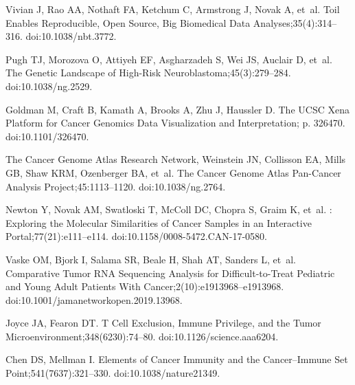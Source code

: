 \documentclass[10pt,letterpaper]{article}
\begin{document}
%
%


\begin{thebibliography}{10}
	
	Vivian J, Rao AA, Nothaft FA, Ketchum C, Armstrong J, Novak A, et~al.
	\newblock Toil Enables Reproducible, Open Source, Big Biomedical Data
	Analyses;35(4):314--316.
	\newblock doi:{10.1038/nbt.3772}.
	
	Pugh TJ, Morozova O, Attiyeh EF, Asgharzadeh S, Wei JS, Auclair D, et~al.
	\newblock The Genetic Landscape of High-Risk Neuroblastoma;45(3):279--284.
	\newblock doi:{10.1038/ng.2529}.
	
	Goldman M, Craft B, Kamath A, Brooks A, Zhu J, Haussler D.
	\newblock The {{UCSC Xena Platform}} for Cancer Genomics Data Visualization and
	Interpretation; p. 326470.
	\newblock doi:{10.1101/326470}.
	
	{The Cancer Genome Atlas Research Network}, Weinstein JN, Collisson EA, Mills
	GB, Shaw KRM, Ozenberger BA, et~al.
	\newblock The {{Cancer Genome Atlas Pan}}-{{Cancer}} Analysis
	Project;45:1113--1120.
	\newblock doi:{10.1038/ng.2764}.
	
	Newton Y, Novak AM, Swatloski T, McColl DC, Chopra S, Graim K, et~al.
	: {{Exploring}} the {{Molecular Similarities}} of
	{{Cancer Samples}} in an {{Interactive Portal}};77(21):e111--e114.
	\newblock doi:{10.1158/0008-5472.CAN-17-0580}.
	
	Vaske OM, Bjork I, Salama SR, Beale H, Shah AT, Sanders L, et~al.
	\newblock Comparative {{Tumor RNA Sequencing Analysis}} for
	{{Difficult}}-to-{{Treat Pediatric}} and {{Young Adult Patients With
			Cancer}};2(10):e1913968--e1913968.
	\newblock doi:{10.1001/jamanetworkopen.2019.13968}.
	
	Joyce JA, Fearon DT.
	\newblock T Cell Exclusion, Immune Privilege, and the Tumor
	Microenvironment;348(6230):74--80.
	\newblock doi:{10.1126/science.aaa6204}.
	
	Chen DS, Mellman I.
	\newblock Elements of Cancer Immunity and the Cancer–Immune Set
	Point;541(7637):321--330.
	\newblock doi:{10.1038/nature21349}.
	

\end{thebibliography}
\end{document}
